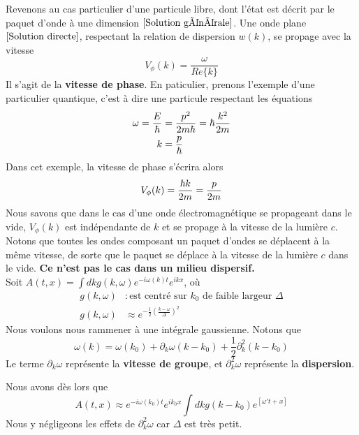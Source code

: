 \documentclass[../notesdecours]{subfiles}
\begin{document}
Revenons au cas particulier d'une particule libre, dont l'état est décrit par le paquet d'onde à une dimension $\eqref{Solution générale}$. Une onde plane $\eqref{Solution directe}$, respectant la relation de dispersion $w(k)$, se propage avec la vitesse
\begin{equation}
V_\phi (k) = \frac{\omega}{Re\{k\}}
\end{equation}
Il s'agit de la \textbf{vitesse de phase}. En paticulier, prenons l'exemple d'une particulier quantique, c'est à dire une particule respectant les équations
\begin{align}
\omega = \frac{E}{\hbar} &= \frac{p^2}{2m\hbar} = \hbar \frac{k^2}{2m}\\
k &= \frac{p}{\hbar}
\end{align}
Dans cet exemple, la vitesse de phase s'écrira alors
\begin{equation}
V_\phi (k) = \frac{\hbar k}{2m} = \frac{p}{2m}
\end{equation}
Nous savons que dans le cas d'une onde électromagnétique se propageant dans le vide, $V_\phi (k)$ est indépendante de $k$ et se propage à la vitesse de la lumière $c$. Notons que toutes les ondes composant un paquet d'ondes se déplacent à la même vitesse, de sorte que le paquet se déplace à la vitesse de la lumière $c$ dans le vide. \textbf{Ce n'est pas le cas dans un milieu dispersif.}\\

Soit $A(t,x) = \int dk g(k,\omega) e^{-i\omega(k)t}e^{ikx}$, où
\begin{align*}
g(k,\omega)&: \text{est centré sur $k_0$ de faible largeur $\Delta$}\\
g(k,\omega) &\approx e^{- \frac{1}{2}(\frac{k-\omega}{\Delta})^2}
\end{align*}
Nous voulons nous rammener à une intégrale gaussienne. Notons que 
\begin{equation}
\omega(k) = \omega (k_0) + \partial_k \omega (k-k_0) + \frac{1}{2}\partial_k^2(k-k_0)
\end{equation}
Le terme $\partial_k \omega$ représente la \textbf{vitesse de groupe}, et $\partial_k^2 \omega$ représente la \textbf{dispersion}.

Nous avons dès lors que
\begin{equation}
A(t,x) \approx e^{-i \omega(k_0)t}e^{ik_0x} \int dk g(k-k_0) e^{\left[\omega't+x\right]}
\end{equation}
Nous y négligeons les effets de $\partial_k^2 \omega$ car $\Delta$ est très petit.\\
\end{document}
